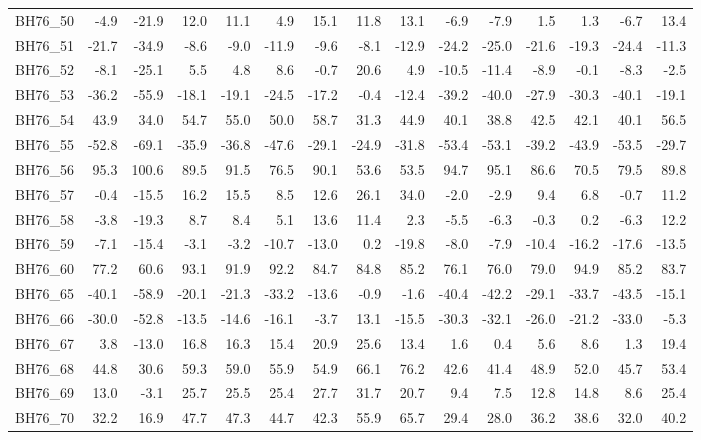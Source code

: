 \begin{longtable}{lrrrrrrrrrrrrrr}
BH76\_50 & -4.9 & -21.9 & 12.0 & 11.1 & 4.9 & 15.1 & 11.8 & 13.1 & -6.9 & -7.9 & 1.5 & 1.3 & -6.7 & 13.4 \\
BH76\_51 & -21.7 & -34.9 & -8.6 & -9.0 & -11.9 & -9.6 & -8.1 & -12.9 & -24.2 & -25.0 & -21.6 & -19.3 & -24.4 & -11.3 \\
BH76\_52 & -8.1 & -25.1 & 5.5 & 4.8 & 8.6 & -0.7 & 20.6 & 4.9 & -10.5 & -11.4 & -8.9 & -0.1 & -8.3 & -2.5 \\
BH76\_53 & -36.2 & -55.9 & -18.1 & -19.1 & -24.5 & -17.2 & -0.4 & -12.4 & -39.2 & -40.0 & -27.9 & -30.3 & -40.1 & -19.1 \\
BH76\_54 & 43.9 & 34.0 & 54.7 & 55.0 & 50.0 & 58.7 & 31.3 & 44.9 & 40.1 & 38.8 & 42.5 & 42.1 & 40.1 & 56.5 \\
BH76\_55 & -52.8 & -69.1 & -35.9 & -36.8 & -47.6 & -29.1 & -24.9 & -31.8 & -53.4 & -53.1 & -39.2 & -43.9 & -53.5 & -29.7 \\
BH76\_56 & 95.3 & 100.6 & 89.5 & 91.5 & 76.5 & 90.1 & 53.6 & 53.5 & 94.7 & 95.1 & 86.6 & 70.5 & 79.5 & 89.8 \\
BH76\_57 & -0.4 & -15.5 & 16.2 & 15.5 & 8.5 & 12.6 & 26.1 & 34.0 & -2.0 & -2.9 & 9.4 & 6.8 & -0.7 & 11.2 \\
BH76\_58 & -3.8 & -19.3 & 8.7 & 8.4 & 5.1 & 13.6 & 11.4 & 2.3 & -5.5 & -6.3 & -0.3 & 0.2 & -6.3 & 12.2 \\
BH76\_59 & -7.1 & -15.4 & -3.1 & -3.2 & -10.7 & -13.0 & 0.2 & -19.8 & -8.0 & -7.9 & -10.4 & -16.2 & -17.6 & -13.5 \\
BH76\_60 & 77.2 & 60.6 & 93.1 & 91.9 & 92.2 & 84.7 & 84.8 & 85.2 & 76.1 & 76.0 & 79.0 & 94.9 & 85.2 & 83.7 \\
BH76\_65 & -40.1 & -58.9 & -20.1 & -21.3 & -33.2 & -13.6 & -0.9 & -1.6 & -40.4 & -42.2 & -29.1 & -33.7 & -43.5 & -15.1 \\
BH76\_66 & -30.0 & -52.8 & -13.5 & -14.6 & -16.1 & -3.7 & 13.1 & -15.5 & -30.3 & -32.1 & -26.0 & -21.2 & -33.0 & -5.3 \\
BH76\_67 & 3.8 & -13.0 & 16.8 & 16.3 & 15.4 & 20.9 & 25.6 & 13.4 & 1.6 & 0.4 & 5.6 & 8.6 & 1.3 & 19.4 \\
BH76\_68 & 44.8 & 30.6 & 59.3 & 59.0 & 55.9 & 54.9 & 66.1 & 76.2 & 42.6 & 41.4 & 48.9 & 52.0 & 45.7 & 53.4 \\
BH76\_69 & 13.0 & -3.1 & 25.7 & 25.5 & 25.4 & 27.7 & 31.7 & 20.7 & 9.4 & 7.5 & 12.8 & 14.8 & 8.6 & 25.4 \\
BH76\_70 & 32.2 & 16.9 & 47.7 & 47.3 & 44.7 & 42.3 & 55.9 & 65.7 & 29.4 & 28.0 & 36.2 & 38.6 & 32.0 & 40.2 \\

\end{longtable}
